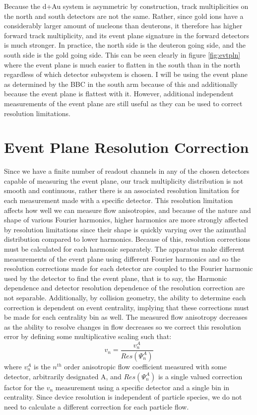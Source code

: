 Because the d+Au system is asymmetric by construction, track multiplicities on the north and south detectors are not the same. Rather, since gold ions have a considerably larger amount of nucleons than deuterons, it therefore has higher forward track multiplicity, and its event plane signature in the forward detectors is much stronger. In practice, the north side is the deuteron going side, and the south side is the gold going side. This can be seen clearly in figure \ref{fig:evtpln} where the event plane is much easier to flatten in the south than in the north regardless of which detector subsystem is chosen. I will be using the event plane as determined by the BBC in the south arm because of this and additionally because the event plane is flattest with it. However, additional independent measurements of the event plane are still useful as they can be used to correct resolution limitations.

\section{Event Plane Resolution Correction}
Since we have a finite number of readout channels in any of the chosen detectors capable of measuring the event plane, our track multiplicity distribution is not smooth and continuous, rather there is an associated resolution limitation for each measurement made with a specific detector. This resolution limitation affects how well we can measure flow anisotropies, and because of the nature and shape of various Fourier harmonics, higher harmonics are more strongly affected by resolution limitations since their shape is quickly varying over the azimuthal distribution compared to lower harmonics. Because of this, resolution corrections must be calculated for each harmonic separately. The apparatus make different measurements of the event plane using different Fourier harmonics and so the resolution corrections made for each detector are coupled to the Fourier harmonic used by the detector to find the event plane, that is to say, the Harmonic dependence and detector resolution dependence of the resolution correction are not separable. Additionally, by collision geometry, the ability to determine each correction is dependent on event centrality, implying that these corrections must be made for each centrality bin as well. The measured flow anisotropy decreases as the ability to resolve changes in flow decreases so we correct this resolution error by defining some multiplicative scaling such that:
\begin{equation}
v_n = \frac{v_n^{A}}{Res(\Psi_n^A)}
\end{equation}
where $v_n^{A}$ is the $n^{th}$ order anisotropic flow coefficient measured with some detector, arbitrarily designated A, and $Res(\Psi_n^A)$ is a single valued correction factor for the $v_n$ measurement using a specific detector and a single bin in centrality. Since device resolution is independent of particle species, we do not need to calculate a different correction for each particle flow. 

